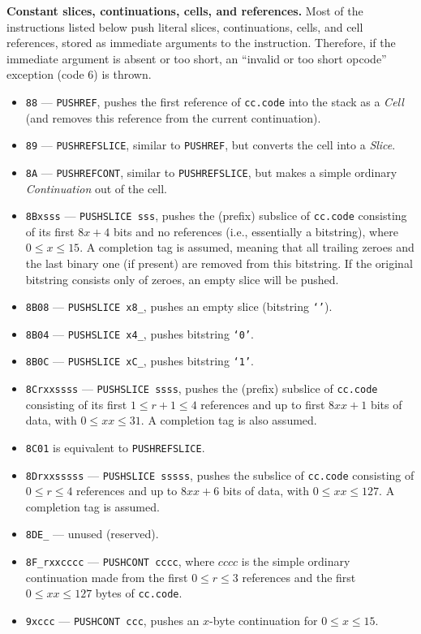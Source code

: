 \documentclass[12pt,oneside]{article}
\def\makepoint#1{\medbreak\noindent{\bf #1.\ }}
\def\nxsubpoint{\refstepcounter{subsubsection}%
  \smallbreak\makepoint{\thesubsubsection}}
\def\emb#1{\textbf{#1.}}
\begin{document}
\nxsubpoint\emb{Constant slices, continuations, cells, and references}
Most of the instructions listed below push literal slices, continuations, cells, and cell references, stored as immediate arguments to the instruction. Therefore, if the immediate argument is absent or too short, an ``invalid or too short opcode'' exception (code $6$) is thrown.
\begin{itemize}
\item {\tt 88} --- {\tt PUSHREF}, pushes the first reference of {\tt cc.code} into the stack as a {\em Cell} (and removes this reference from the current continuation).
\item {\tt 89} --- {\tt PUSHREFSLICE}, similar to {\tt PUSHREF}, but converts the cell into a {\em Slice}.
\item {\tt 8A} --- {\tt PUSHREFCONT}, similar to {\tt PUSHREFSLICE}, but makes a simple ordinary {\em Continuation\/} out of the cell.
\item {\tt 8Bxsss} --- {\tt PUSHSLICE sss}, pushes the (prefix) subslice of {\tt cc.code} consisting of its first $8x+4$ bits and no references (i.e., essentially a bitstring), where $0\leq x\leq15$. A completion tag is assumed, meaning that all trailing zeroes and the last binary one (if present) are removed from this bitstring. If the original bitstring consists only of zeroes, an empty slice will be pushed.
\item {\tt 8B08} --- {\tt PUSHSLICE x8\_}, pushes an empty slice (bitstring {\tt `'}).
\item {\tt 8B04} --- {\tt PUSHSLICE x4\_}, pushes bitstring {\tt `0'}.
\item {\tt 8B0C} --- {\tt PUSHSLICE xC\_}, pushes bitstring {\tt `1'}.
\item {\tt 8Crxxssss} --- {\tt PUSHSLICE ssss}, pushes the (prefix) subslice of {\tt cc.code} consisting of its first $1\leq r+1\leq 4$ references and up to first $8xx+1$ bits of data, with $0\leq xx\leq 31$. A completion tag is also assumed.
\item {\tt 8C01} is equivalent to {\tt PUSHREFSLICE}.
\item {\tt 8Drxxsssss} --- {\tt PUSHSLICE sssss}, pushes the subslice of {\tt cc.code} consisting of $0\leq r\leq 4$ references and up to $8xx+6$ bits of data, with $0\leq xx\leq 127$. A completion tag is assumed.
\item {\tt 8DE\_} --- unused (reserved).
\item {\tt 8F\_rxxcccc} --- {\tt PUSHCONT cccc}, where $cccc$ is the simple ordinary continuation made from the first $0\leq r\leq 3$ references and the first $0\leq xx\leq 127$ bytes of {\tt cc.code}.
\item {\tt 9xccc} --- {\tt PUSHCONT ccc}, pushes an $x$-byte continuation for $0\leq x\leq 15$.
\end{itemize}
\end{document}
